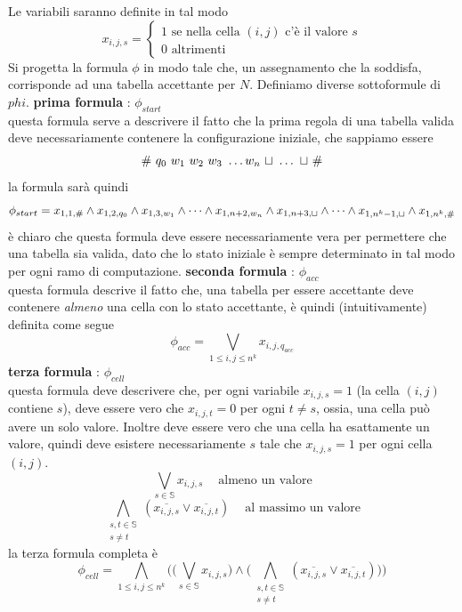 \documentclass[10pt, letterpaper]{report}
\begin{document}
Le variabili saranno definite in tal modo $$x_{i,j,s}=\begin{cases}
    1 \text{ se nella cella $(i,j)$ c'è il valore }s \\ 
    0 \text{ altrimenti }
\end{cases} $$
Si progetta la formula $\phi$ in modo tale che, un assegnamento che la soddisfa, corrisponde ad una tabella accettante per $N$. Definiamo diverse sottoformule di $phi$.\acc 
\textbf{prima formula} : $\phi_{start}$\\
questa formula serve a descrivere il fatto che la prima regola di una tabella valida deve necessariamente contenere la configurazione iniziale, che sappiamo essere 
$$ \# \  q_0 \ w_1 \ w_2 \ w_3 \ \dots w_n \ \blank \ \dots \ \blank \ \#$$
la formula sarà quindi 
$$ 
\phi_{start}=x_{1,1,\#}\land x_{1,2,q_0}\land x_{1,3,w_1} \land \dots \land  
x_{1,n+2,w_n}\land x_{1,n+3,{\sqcup} }\land \dots \land  
x_{1,n^k-1,{\sqcup} }\land x_{1,n^k,\#}
$$
è chiaro che questa formula deve essere necessariamente vera per permettere che una tabella sia valida, dato che lo stato iniziale è sempre determinato in tal modo per ogni ramo di computazione.\acc
\textbf{seconda formula} : $\phi_{acc}$\\ 
questa formula descrive il fatto che, una tabella per essere accettante deve contenere \textit{almeno} una cella con lo stato accettante, è quindi (intuitivamente) definita come segue $$ 
\phi_{acc}=\bigvee_{1 \leq i,j \leq n^k} x_{i,j,q_{acc}}$$
\textbf{terza formula} : $\phi_{cell}$\\
questa formula deve descrivere che, per ogni variabile $x_{i,j,s}=1$ (la cella $(i,j)$ contiene $s$), deve essere vero che $x_{i,j,t}=0$ per ogni $t\ne s$, ossia, una cella può avere un solo valore. Inoltre deve essere vero che una cella ha esattamente un valore, quindi deve esistere necessariamente $s$ tale che $x_{i,j,s}=1$ per ogni cella $(i,j)$. 
$$\bigvee_{s\in\mathbb S} x_{i,j,s} \ \ \ \   \text{ almeno un valore}$$
$$ \bigwedge\limits_{\begin{matrix}s,t\in\mathbb{S}\\ s\ne t\end{matrix}}
(\overline{x_{i,j,s}}\lor \overline{x_{i,j,t}})\ \ \ \   \text{ al massimo un valore}$$
la terza formula completa è 
$$ \phi_{cell}=\bigwedge\limits_{1 \leq i,j \leq n^k} \Big(
    \Big(\bigvee_{s\in\mathbb S} x_{i,j,s}\Big) \land
    \Big(\bigwedge\limits_{\begin{matrix}s,t\in\mathbb{S}\\ s\ne t\end{matrix}}
    (\overline{x_{i,j,s}}\lor \overline{x_{i,j,t}})\Big) 
\Big)$$
\end{document}
